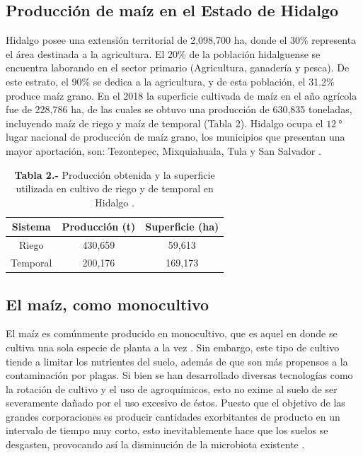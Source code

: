 \documentclass[12pt,letterpaper,oneside]{report}
\begin{document}
\subsection{Producción de maíz en el Estado de Hidalgo}
Hidalgo posee una extensión territorial de 2,098,700 ha, donde el 30\% representa el área destinada a la agricultura. El 20\% de la población hidalguense se encuentra laborando en el sector primario (Agricultura, ganadería y pesca). De este estrato, el 90\% se dedica a la agricultura, y de esta población, el 31.2\% produce maíz grano. En el 2018 la superficie cultivada de maíz en el año agrícola fue de 228,786 ha, de las cuales se obtuvo una producción de 630,835 toneladas, incluyendo maíz de riego y maíz de temporal (Tabla 2). Hidalgo ocupa el $\SI{12}{\degree}$ lugar nacional de producción de maíz grano, los municipios que presentan una mayor aportación, son: Tezontepec, Mixquiahuala, Tula y San Salvador \autocite{SIAP2017, INEGI2017}.
\begin{table}[h]
\begin{center}
\caption*{\textbf{Tabla 2.-} Producción obtenida y la superficie utilizada en cultivo de riego y de temporal en Hidalgo \autocite{INEGI2017}.}
\label{Tabla 2}
\begin{tabular}{ccc}
\toprule[0.5mm]
Sistema & Producción (t) & Superficie (ha)\\
\midrule
Riego & 430,659 & 59,613 \\
Temporal & 200,176 & 169,173 \\
\bottomrule[0.5mm]
\end{tabular}
\end{center}
\end{table}
\newpage
\subsection{El maíz, como monocultivo}
El maíz es comúnmente producido en monocultivo, que es aquel en donde se cultiva una sola especie de planta a la vez \autocite{Connor2011}. Sin embargo, este tipo de cultivo tiende a limitar los nutrientes del suelo, además de que son más propensos a la contaminación por plagas. Si bien se han desarrollado diversas tecnologías como la rotación de cultivo y el uso de agroquímicos, esto no exime al suelo de ser severamente dañado por el uso excesivo de éstos. Puesto que el objetivo de las grandes corporaciones es producir cantidades exorbitantes de producto en un intervalo de tiempo muy corto, esto inevitablemente hace que los suelos se desgasten, provocando así la disminución de la microbiota existente \autocite{Wang2014,Yang2016a,Zhang2017}.
\par  
\end{document}
